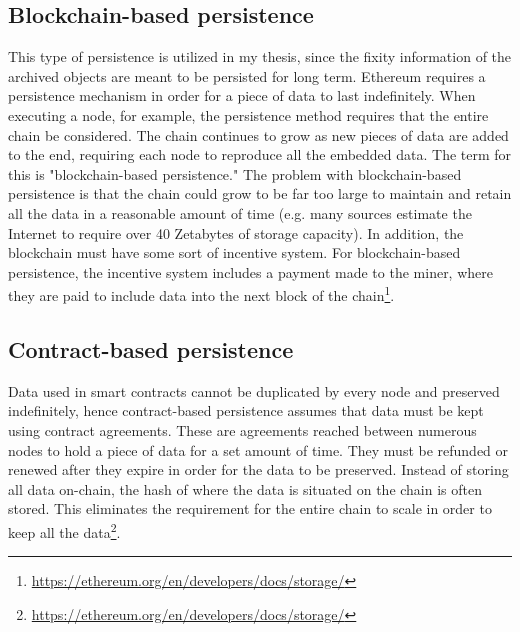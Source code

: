 \subsection{Blockchain-based persistence}
This type of persistence is utilized in my thesis, since the fixity information of the archived objects are meant to be persisted for long term.
Ethereum requires a persistence mechanism in order for a piece of data to last indefinitely. When executing a node, for example, the persistence method requires that the entire chain be considered. The chain continues to grow as new pieces of data are added to the end, requiring each node to reproduce all the embedded data. The term for this is "blockchain-based persistence." The problem with blockchain-based persistence is that the chain could grow to be far too large to maintain and retain all the data in a reasonable amount of time (e.g. many sources estimate the Internet to require over 40 Zetabytes of storage capacity). In addition, the blockchain must have some sort of incentive system.
For blockchain-based persistence, the incentive system includes a payment made to the miner, where they are paid to include data into the next block of the chain\footnote{\url{https://ethereum.org/en/developers/docs/storage/}}.
\subsection{Contract-based persistence}
Data used in smart contracts cannot be duplicated by every node and preserved indefinitely, hence contract-based persistence assumes that data must be kept using contract agreements. These are agreements reached between numerous nodes to hold a piece of data for a set amount of time. They must be refunded or renewed after they expire in order for the data to be preserved. Instead of storing all data on-chain, the hash of where the data is situated on the chain is often stored. This eliminates the requirement for the entire chain to scale in order to keep all the data\footnote{\url{https://ethereum.org/en/developers/docs/storage/}}.

